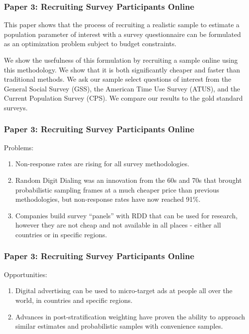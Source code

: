 \documentclass[aspectratio=169]{beamer}
\begin{document}
\begin{frame}
\frametitle{Paper 3: Recruiting Survey Participants Online }  

This paper shows that the process of recruiting a realistic sample to estimate a population parameter of interest with a survey questionnaire can be formulated as an optimization problem subject to budget constraints.

We show the usefulness of this formulation by recruiting a sample online using this methodology. We show that it is both significantly cheaper and faster than traditional methods. We ask our sample select questions of interest from the General Social Survey (GSS), the American Time Use Survey (ATUS), and the Current Population Survey (CPS). We compare our results to the gold standard surveys. 

\end{frame}




\begin{frame}
\frametitle{Paper 3: Recruiting Survey Participants Online }  

Problems: 

\begin{enumerate}
\item Non-response rates are rising for all survey methodologies. 
\item Random Digit Dialing was an innovation from the 60s and 70s that brought probabilistic sampling frames at a much cheaper price than previous methodologies, but non-response rates have now reached 91\%.
\item Companies build survey ``panels'' with RDD that can be used for research, however they are not cheap and not available in all places - either all countries or in specific regions. 
\end{enumerate}

\end{frame}

\begin{frame}
\frametitle{Paper 3: Recruiting Survey Participants Online }  

Opportunities:

\begin{enumerate}
\item Digital advertising can be used to micro-target ads at people all over the world, in countries and specific regions. 
\item Advances in post-stratification weighting have proven the ability to approach similar estimates and probabilistic samples with convenience samples. 
\end{enumerate}

\end{frame}
\end{document}
